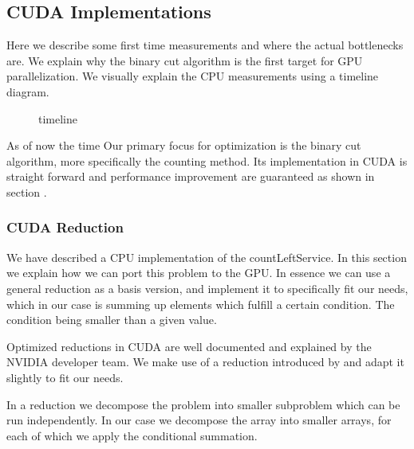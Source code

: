 \documentclass[]{article}
\begin{document}
\subsection{CUDA Implementations}

Here we describe some first time measurements and where the actual bottlenecks are. We explain why the binary cut algorithm is the first target for GPU parallelization.
We visually explain the CPU measurements using a timeline diagram.

\begin{figure}
	\begin{center}
	\end{center}
	\caption{timeline}
	\label{u}
\end{figure}

As of now the time
Our primary focus for optimization is the binary cut algorithm, more specifically the counting method. Its implementation in CUDA is straight forward and performance improvement are guaranteed as shown in section . 

\subsubsection{CUDA Reduction}
We have described a CPU implementation of the countLeftService. In this section we explain how we can port this problem to the GPU. In essence we can use a general reduction as a basis version, and implement it to specifically fit our needs, which in our case is summing up elements which fulfill a certain condition. The condition being smaller than a given value.

Optimized reductions in CUDA are well documented and explained by the NVIDIA developer team. We make use of a reduction introduced by  and adapt it slightly to fit our needs.

In a reduction we decompose the problem into smaller subproblem which can be run independently. In our case we decompose the array into smaller arrays, for each of which we apply the conditional summation. 
\end{document}
